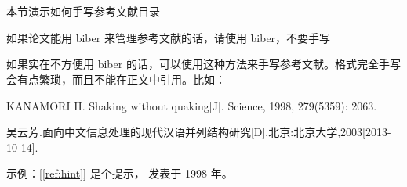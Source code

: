 \chapter{\bibname}

\begin{manref}
\item \label{ref:hint} 本节演示如何手写参考文献目录
\item 如果论文能用 biber 来管理参考文献的话，请使用 biber，不要手写
\item 如果实在不方便用 biber 的话，可以使用这种方法来手写参考文献。格式完全手写会有点繁琐，而且不能在正文中引用。比如：
\item \label{ref:man} KANAMORI H. Shaking without quaking[J]. Science, 1998, 279(5359): 2063.
\item 吴云芳.面向中文信息处理的现代汉语并列结构研究[D].北京:北京大学,2003[2013-10-14].
\end{manref}

示例：[\ref{ref:hint}] 是个提示， 发表于 1998 年。
